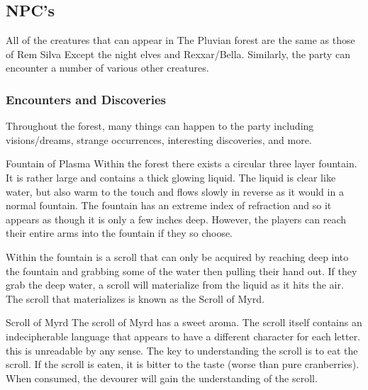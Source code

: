 \subsection{NPC's}

All of the creatures that can appear in The Pluvian forest are the same as those of Rem Silva Except the night elves and Rexxar/Bella. Similarly, the party can encounter a number of various other creatures.

\subsubsection{Encounters and Discoveries}

Throughout the forest, many things can happen to the party including visions/dreams, strange occurrences, interesting discoveries, and more.

\begin{commentbox}{Fountain of Plasma}
	Within the forest there exists a circular three layer fountain. It is rather large and contains a thick glowing liquid. The liquid is clear like water, but also warm to the touch and flows slowly in reverse as it would in a normal fountain. The fountain has an extreme index of refraction and so it appears as though it is only a few inches deep. However, the players can reach their entire arms into the fountain if they so choose.
	
	Within the fountain is a scroll that can only be acquired by reaching deep into the fountain and grabbing some of the water then pulling their hand out. If they grab the deep water, a scroll will materialize from the liquid as it hits the air. The scroll that materializes is known as the Scroll of Myrd.
\end{commentbox}


\begin{commentbox}{Scroll of Myrd}
	The scroll of Myrd has a sweet aroma. The scroll itself contains an indecipherable language that appears to have a different character for each letter. this is unreadable by any sense. The key to understanding the scroll is to eat the scroll. If the scroll is eaten, it is bitter to the taste (worse than pure cranberries). When consumed, the devourer will gain the understanding of the scroll.	
\end{commentbox}


